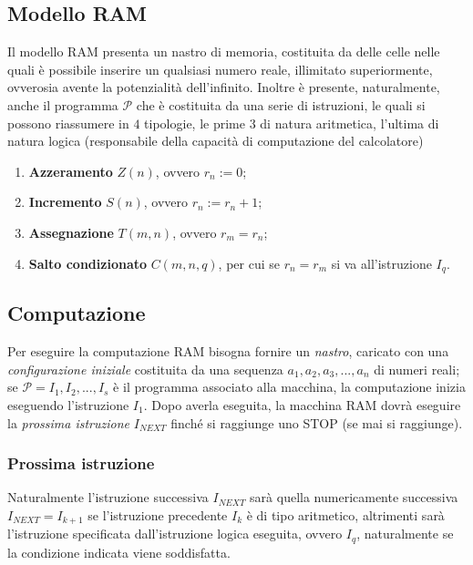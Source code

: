 \documentclass[a4paper]{extarticle}
\begin{document}
\vspace{1em}
\subsection{Modello RAM}
Il modello RAM presenta un nastro di memoria, costituita da delle celle nelle quali è possibile inserire un qualsiasi numero reale, illimitato superiormente, ovverosia avente la potenzialità dell'infinito. Inoltre è presente, naturalmente, anche il programma \(\mathcal{P}\) che è costituita da una serie di istruzioni, le quali si possono riassumere in \(4\) tipologie, le prime \(3\) di natura aritmetica, l'ultima di natura logica (responsabile della capacità di computazione del calcolatore)
\begin{enumerate}
    \item \textbf{Azzeramento} \(Z(n)\), ovvero \(r_n := 0\);
    \item \textbf{Incremento} \(S(n)\), ovvero \(r_n := r_n + 1\);
    \item \textbf{Assegnazione} \(T(m, n)\), ovvero \(r_m = r_n\);
    \item \textbf{Salto condizionato} \(C(m, n, q)\), per cui se \(r_n = r_m\) si va all'istruzione \(I_q\).
\end{enumerate}

\vspace{1em}
\subsection{Computazione}
Per eseguire la computazione RAM bisogna fornire un \textit{nastro}, caricato con una \textit{configurazione iniziale} costituita da una sequenza \(a_1, a_2,a_3, ..., a_n\) di numeri reali; se \(\mathcal{P} = I_1, I_2, ..., I_s\) è il programma associato alla macchina, la computazione inizia eseguendo l'istruzione \(I_1\). Dopo averla eseguita, la macchina RAM dovrà eseguire la \textit{prossima istruzione} \(I_{\textit{NEXT}}\) finché si raggiunge uno STOP (se mai si raggiunge).

\vspace{1em}
\subsubsection{Prossima istruzione}
Naturalmente l'istruzione successiva \(I_{\textit{NEXT}}\) sarà quella numericamente successiva \(I_{\textit{NEXT}} = I_{k + 1}\) se l'istruzione precedente \(I_k\) è di tipo aritmetico, altrimenti sarà l'istruzione specificata dall'istruzione logica eseguita, ovvero \(I_q\), naturalmente se la condizione indicata viene soddisfatta.
\end{document}
